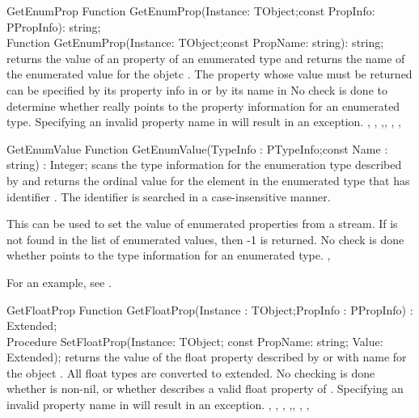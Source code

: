 \begin{function}{GetEnumProp}
\Declaration
Function GetEnumProp(Instance: TObject;const PropInfo: PPropInfo): string;\\
Function GetEnumProp(Instance: TObject;const PropName: string): string;       
\Description
{} returns the value of an property of an enumerated type
and returns the name of the enumerated value for the objetc . 
The property whose value must be returned can be specified by its property 
info in  or by its name in 
\Errors
No check is done to determine whether  really points to the 
property information for an enumerated type. 
Specifying an invalid property name in  will result in an
 exception.
\SeeAlso
{} , ,
,, ,
, 
\end{function}


\begin{function}{GetEnumValue}
\Declaration
Function GetEnumValue(TypeInfo : PTypeInfo;const Name : string) : Integer;
\Description
{} scans the type information for the enumeration type
described by  and returns the ordinal value for the element
in the enumerated type that has identifier . The identifier is
searched in a case-insensitive manner.

This can be used to set the value of enumerated properties from a stream. 
\Errors
If  is not found in the list of enumerated values, then -1 is
returned. No check is done whether  points to the type information
for an enumerated type. 
\SeeAlso
{}, 
\end{function}

For an example, see .

\begin{function}{GetFloatProp}
\Declaration
Function GetFloatProp(Instance : TObject;PropInfo : PPropInfo) : Extended;\\
Procedure SetFloatProp(Instance: TObject; const PropName: string; Value: Extended);
\Description
{} returns the value of the float property described by 
 or with name  for the object . 
All float types are converted
to extended.
\Errors
No checking is done whether  is non-nil, or whether
 describes a valid float property of .
Specifying an invalid property name in  will result in an
 exception.
\SeeAlso
{}, , ,
,, ,
, 
\end{function}

